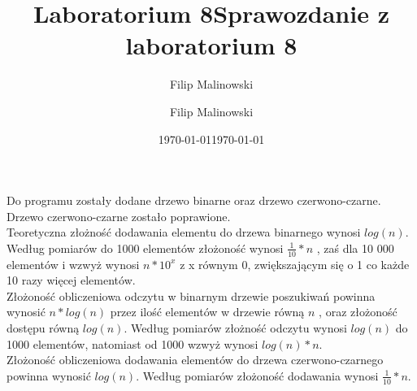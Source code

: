 \documentclass[a4paper,10pt]{scrartcl}
\title{Laboratorium 8}
\author{Filip Malinowski}
\date{\today}
\begin{document}
\title{Sprawozdanie z laboratorium 8}
\author{Filip Malinowski}
\date{\today}

\maketitle

Do programu zostały dodane drzewo binarne oraz
drzewo czerwono-czarne.
Drzewo czerwono-czarne zostało poprawione.
\\

Teoretyczna złożność dodawania elementu do
drzewa binarnego wynosi
\begin{math}
  log(n).
\end{math}
Według pomiarów do 1000 elementów złożoność
wynosi
\begin{math}
\frac{1}{10} * n
\end{math}
, zaś dla 10 000 elementów i wzwyż wynosi
\begin{math}
 n * 10^x
\end{math}
z x równym 0, zwiększającym się o 1 co każde
10 razy więcej elementów.
\\

Złożoność obliczeniowa odczytu w binarnym
drzewie poszukiwań powinna wynosić
\begin{math}
 n*log(n)
\end{math}
przez ilość elementów w drzewie równą
\begin{math}
n
\end{math}
, oraz złożoność dostępu równą
\begin{math}
 log(n)
\end{math}.
Według pomiarów złożność odczytu wynosi
\begin{math}
 log(n)
\end{math}
do 1000 elementów, natomiast od 1000 wzwyż
wynosi
\begin{math}
 log(n) * n
\end{math}.
\\

Złożoność obliczeniowa dodawania elementów do
drzewa czerwono-czarnego powinna wynosić
\begin{math}
  log(n).
\end{math}
Według pomiarów złożoność dodawania wynosi
\begin{math}
\frac{1}{10} * n
\end{math}.
\\
\end{document}
